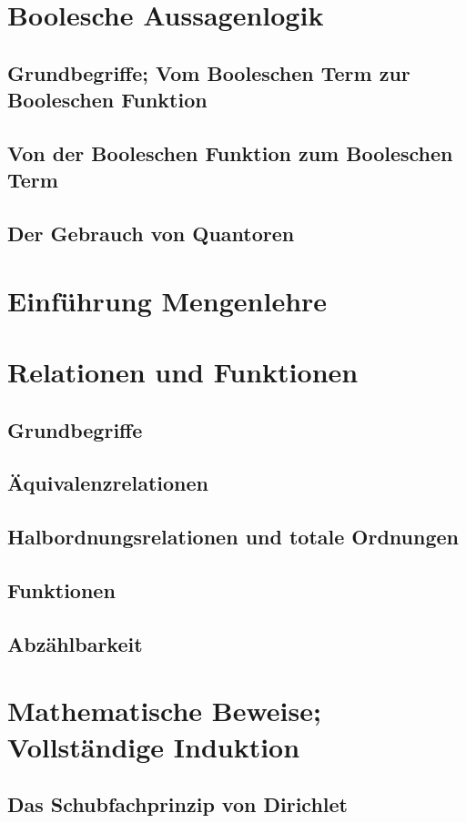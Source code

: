 %
%
%
\section{Boolesche Aussagenlogik}

\subsection{Grundbegriffe; Vom Booleschen Term zur Booleschen Funktion}
\subsection{Von der Booleschen Funktion zum Booleschen Term}
\subsection{Der Gebrauch von Quantoren}
%
%
%
\section{Einführung Mengenlehre}
%
%
%
\section{Relationen und Funktionen}

\subsection{Grundbegriffe}
\subsection{Äquivalenzrelationen}
\subsection{Halbordnungsrelationen und totale Ordnungen}
\subsection{Funktionen}
\subsection{Abzählbarkeit}
%
%
%
\section{Mathematische Beweise; Vollständige Induktion}

\subsection{Das Schubfachprinzip von Dirichlet}
